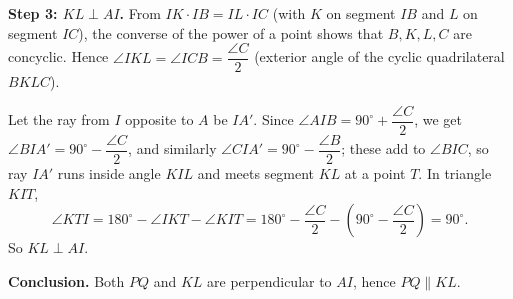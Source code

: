 \textbf{Step 3: $KL\perp AI$.} From $IK\cdot IB=IL\cdot IC$ (with $K$ on segment $IB$ and $L$ on segment $IC$), the converse of the power of a point shows that $B,K,L,C$ are concyclic. Hence $\angle IKL=\angle ICB=\dfrac{\angle C}{2}$ (exterior angle of the cyclic quadrilateral $BKLC$).

Let the ray from $I$ opposite to $A$ be $IA'$. Since $\angle AIB=90^\circ+\dfrac{\angle C}{2}$, we get $\angle BIA'=90^\circ-\dfrac{\angle C}{2}$, and similarly $\angle CIA'=90^\circ-\dfrac{\angle B}{2}$; these add to $\angle BIC$, so ray $IA'$ runs inside angle $KIL$ and meets segment $KL$ at a point $T$. In triangle $KIT$,
\[
\angle KTI=180^\circ-\angle IKT-\angle KIT=180^\circ-\dfrac{\angle C}{2}-\left(90^\circ-\dfrac{\angle C}{2}\right)=90^\circ .
\]
So $KL\perp AI$.

\textbf{Conclusion.} Both $PQ$ and $KL$ are perpendicular to $AI$, hence $\boxed{PQ\parallel KL}$.
